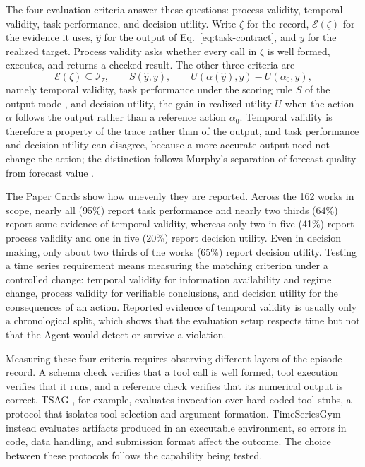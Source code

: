 \documentclass[preprints,article,submit,moreauthors]{Definitions/mdpi}
\begin{document}
The four evaluation criteria answer these questions: process validity, temporal validity, task performance, and decision utility. Write $\zeta$ for the record, $\mathcal{E}(\zeta)$ for the evidence it uses, $\widehat{y}$ for the output of Eq.~\eqref{eq:task-contract}, and $y$ for the realized target. Process validity asks whether every call in $\zeta$ is well formed, executes, and returns a checked result. The other three criteria are
\begin{equation}
  \mathcal{E}(\zeta)\subseteq\mathcal{I}_{\tau},\qquad
  S(\widehat{y},y),\qquad
  U\!\left(\alpha(\widehat{y}),y\right)-U\!\left(\alpha_0,y\right),
  \label{eq:eval-criteria}
\end{equation}
namely temporal validity, task performance under the scoring rule $S$ of the output mode \citep{gneiting2007scoring}, and decision utility, the gain in realized utility $U$ when the action $\alpha$ follows the output rather than a reference action $\alpha_0$. Temporal validity is therefore a property of the trace rather than of the output, and task performance and decision utility can disagree, because a more accurate output need not change the action; the distinction follows Murphy's separation of forecast quality from forecast value \citep{murphy1993goodforecast}.

The Paper Cards show how unevenly they are reported. Across the 162 works in scope, nearly all (95\%) report task performance and nearly two thirds (64\%) report some evidence of temporal validity, whereas only two in five (41\%) report process validity and one in five (20\%) report decision utility. Even in decision making, only about two thirds of the works (65\%) report decision utility. Testing a time series requirement means measuring the matching criterion under a controlled change: temporal validity for information availability and regime change, process validity for verifiable conclusions, and decision utility for the consequences of an action. Reported evidence of temporal validity is usually only a chronological split, which shows that the evaluation setup respects time but not that the Agent would detect or survive a violation.

Measuring these four criteria requires observing different layers of the episode record. A schema check verifies that a tool call is well formed, tool execution verifies that it runs, and a reference check verifies that its numerical output is correct. TSAG \citep{tsag2026}, for example, evaluates invocation over hard-coded tool stubs, a protocol that isolates tool selection and argument formation. TimeSeriesGym \citep{timeseriesgym2025} instead evaluates artifacts produced in an executable environment, so errors in code, data handling, and submission format affect the outcome. The choice between these protocols follows the capability being tested.
\end{document}
